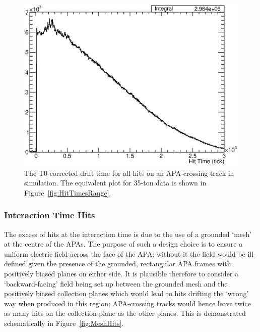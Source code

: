 \begin{figure}
  \centering
  \includegraphics[width=12cm]{HitTimesMC.eps}
  \caption[The T0-corrected drift time for all hits on an APA-crossing track in simulation.]{The T0-corrected drift time for all hits on an APA-crossing track in simulation.  The equivalent plot for 35-ton data is shown in Figure~\ref{fig:HitTimesRange}.}
  \label{fig:HitTimesMC}
\end{figure}

\subsubsection{Interaction Time Hits}\label{sec:InteractionTimeHits}

The excess of hits at the interaction time is due to the use of a grounded `mesh' at the centre of the APAs.  The purpose of such a design choice is to ensure a uniform electric field across the face of the APA; without it the field would be ill-defined given the presence of the grounded, rectangular APA frames with positively biased planes on either side.  It is plausible therefore to consider a `backward-facing' field being set up between the grounded mesh and the positively biased collection planes which would lead to hits drifting the `wrong' way when produced in this region; APA-crossing tracks would hence leave twice as many hits on the collection plane as the other planes.  This is demonstrated schematically in Figure~\ref{fig:MeshHits}.

